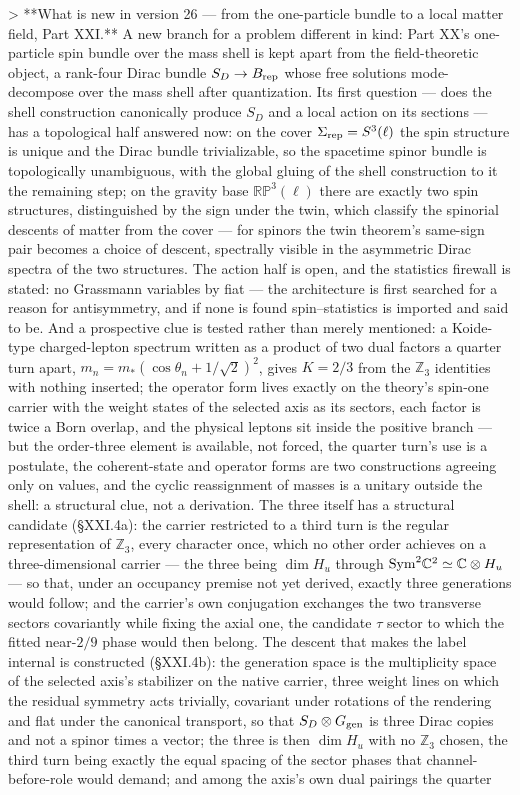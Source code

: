 > **What is new in version 26 — from the one-particle bundle to a local matter field, Part XXI.** A new branch for a problem different in kind: Part XX's one-particle spin bundle over the mass shell is kept apart from the field-theoretic object, a rank-four Dirac bundle $S_D\to B_{\rm rep}$ whose free solutions mode-decompose over the mass shell after quantization. Its first question — does the shell construction canonically produce $S_D$ and a local action on its sections — has a topological half answered now: on the cover $\Sigma_{\rm rep} = S^3(\ell)$ the spin structure is unique and the Dirac bundle trivializable, so the spacetime spinor bundle is topologically unambiguous, with the global gluing of the shell construction to it the remaining step; on the gravity base $\mathbb{RP}^3(\ell)$ there are exactly two spin structures, distinguished by the sign under the twin, which classify the spinorial descents of matter from the cover — for spinors the twin theorem's same-sign pair becomes a choice of descent, spectrally visible in the asymmetric Dirac spectra of the two structures. The action half is open, and the statistics firewall is stated: no Grassmann variables by fiat — the architecture is first searched for a reason for antisymmetry, and if none is found spin–statistics is imported and said to be. And a prospective clue is tested rather than merely mentioned: a Koide-type charged-lepton spectrum written as a product of two dual factors a quarter turn apart, $m_n = m_*(\cos\theta_n+1/\sqrt2)^2$, gives $K = 2/3$ from the $\mathbb Z_3$ identities with nothing inserted; the operator form lives exactly on the theory's spin-one carrier with the weight states of the selected axis as its sectors, each factor is twice a Born overlap, and the physical leptons sit inside the positive branch — but the order-three element is available, not forced, the quarter turn's use is a postulate, the coherent-state and operator forms are two constructions agreeing only on values, and the cyclic reassignment of masses is a unitary outside the shell: a structural clue, not a derivation. The three itself has a structural candidate (§XXI.4a): the carrier restricted to a third turn is the regular representation of $\mathbb Z_3$, every character once, which no other order achieves on a three-dimensional carrier — the three being $\dim H_u$ through ${\rm Sym}^2\mathbb C^2\simeq\mathbb C\otimes H_u$ — so that, under an occupancy premise not yet derived, exactly three generations would follow; and the carrier's own conjugation exchanges the two transverse sectors covariantly while fixing the axial one, the candidate $\tau$ sector to which the fitted near-$2/9$ phase would then belong. The descent that makes the label internal is constructed (§XXI.4b): the generation space is the multiplicity space of the selected axis's stabilizer on the native carrier, three weight lines on which the residual symmetry acts trivially, covariant under rotations of the rendering and flat under the canonical transport, so that $S_D\otimes G_{\rm gen}$ is three Dirac copies and not a spinor times a vector; the three is then $\dim H_u$ with no $\mathbb Z_3$ chosen, the third turn being exactly the equal spacing of the sector phases that channel-before-role would demand; and among the axis's own dual pairings the quarter 